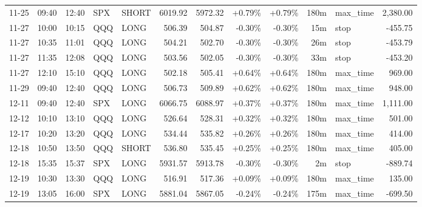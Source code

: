 \documentclass[11pt,a4paper,twoside]{article}
\begin{document}
\begin{center}
\begin{longtable}{>{\color{txtmain}}l l l l l r r r r r >{\color{txtmain}}l r}
11-25 & 09:40 & 12:40 & SPX & SHORT & 6019.92 & 5972.32 & \textcolor{wingreen}{+0.79\%} & \textcolor{wingreen}{+0.79\%} & 180m & max\_time & \textcolor{wingreen}{2,380.00} \\
11-27 & 10:00 & 10:15 & QQQ & LONG & 506.39 & 504.87 & \textcolor{lossred}{-0.30\%} & \textcolor{lossred}{-0.30\%} & 15m & stop & \textcolor{lossred}{-455.75} \\
11-27 & 10:35 & 11:01 & QQQ & LONG & 504.21 & 502.70 & \textcolor{lossred}{-0.30\%} & \textcolor{lossred}{-0.30\%} & 26m & stop & \textcolor{lossred}{-453.79} \\
11-27 & 11:35 & 12:08 & QQQ & LONG & 503.56 & 502.05 & \textcolor{lossred}{-0.30\%} & \textcolor{lossred}{-0.30\%} & 33m & stop & \textcolor{lossred}{-453.20} \\
11-27 & 12:10 & 15:10 & QQQ & LONG & 502.18 & 505.41 & \textcolor{wingreen}{+0.64\%} & \textcolor{wingreen}{+0.64\%} & 180m & max\_time & \textcolor{wingreen}{969.00} \\
11-29 & 09:40 & 12:40 & QQQ & LONG & 506.73 & 509.89 & \textcolor{wingreen}{+0.62\%} & \textcolor{wingreen}{+0.62\%} & 180m & max\_time & \textcolor{wingreen}{948.00} \\
12-11 & 09:40 & 12:40 & SPX & LONG & 6066.75 & 6088.97 & \textcolor{wingreen}{+0.37\%} & \textcolor{wingreen}{+0.37\%} & 180m & max\_time & \textcolor{wingreen}{1,111.00} \\
12-12 & 10:10 & 13:10 & QQQ & LONG & 526.64 & 528.31 & \textcolor{wingreen}{+0.32\%} & \textcolor{wingreen}{+0.32\%} & 180m & max\_time & \textcolor{wingreen}{501.00} \\
12-17 & 10:20 & 13:20 & QQQ & LONG & 534.44 & 535.82 & \textcolor{wingreen}{+0.26\%} & \textcolor{wingreen}{+0.26\%} & 180m & max\_time & \textcolor{wingreen}{414.00} \\
12-18 & 10:50 & 13:50 & QQQ & SHORT & 536.80 & 535.45 & \textcolor{wingreen}{+0.25\%} & \textcolor{wingreen}{+0.25\%} & 180m & max\_time & \textcolor{wingreen}{405.00} \\
12-18 & 15:35 & 15:37 & SPX & LONG & 5931.57 & 5913.78 & \textcolor{lossred}{-0.30\%} & \textcolor{lossred}{-0.30\%} & 2m & stop & \textcolor{lossred}{-889.74} \\
12-19 & 10:30 & 13:30 & QQQ & LONG & 516.91 & 517.36 & \textcolor{wingreen}{+0.09\%} & \textcolor{wingreen}{+0.09\%} & 180m & max\_time & \textcolor{wingreen}{135.00} \\
12-19 & 13:05 & 16:00 & SPX & LONG & 5881.04 & 5867.05 & \textcolor{lossred}{-0.24\%} & \textcolor{lossred}{-0.24\%} & 175m & max\_time & \textcolor{lossred}{-699.50} \\

\end{longtable}
\end{center}
\end{document}
